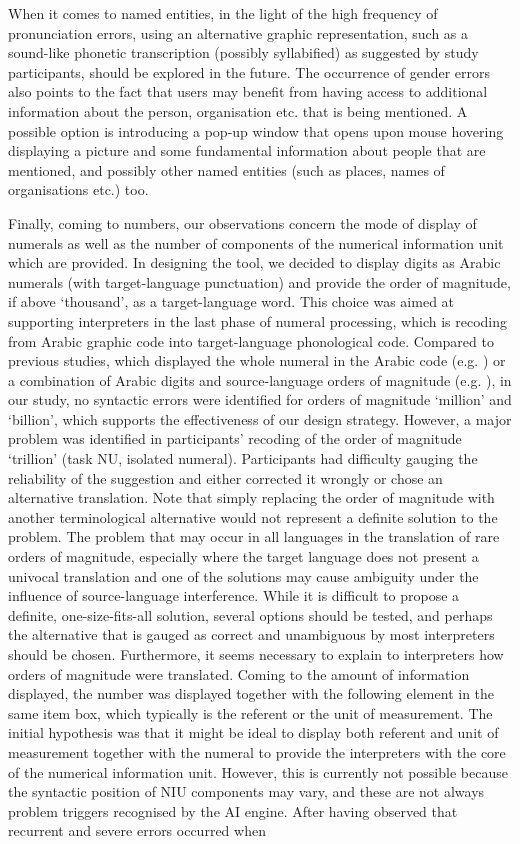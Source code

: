 When it comes to named entities, in the light of the high frequency of pronunciation errors, using an alternative graphic representation, such as a sound-like phonetic transcription (possibly syllabified) as suggested by study participants, should be explored in the future. The occurrence of gender errors also points to the fact that users may benefit from having access to additional information about the person, organisation etc. that is being mentioned. A possible option is introducing a pop-up window that opens upon mouse hovering displaying a picture and some fundamental information about people that are mentioned, and possibly other named entities (such as places, names of organisations etc.) too.

Finally, coming to numbers, our observations concern the mode of display of numerals as well as the number of components of the numerical information unit which are provided. In designing the tool, we decided to display digits as Arabic numerals (with target-language punctuation) and provide the order of magnitude, if above ‘thousand’, as a target-language word. This choice was aimed at supporting interpreters in the last phase of numeral processing, which is recoding from Arabic graphic code into target-language phonological code. Compared to previous studies, which displayed the whole numeral in the Arabic code (e.g. \cite{canali2019technologie}) or a combination of Arabic digits and source-language orders of magnitude (e.g. \cite{pisani2021measuring}), in our study, no syntactic errors were identified for orders of magnitude ‘million’ and ‘billion’, which supports the effectiveness of our design strategy. However, a major problem was identified in participants’ recoding of the order of magnitude ‘trillion’ (task NU, isolated numeral). Participants had difficulty gauging the reliability of the suggestion and either corrected it wrongly or chose an alternative translation. Note that simply replacing the order of magnitude with another terminological alternative would not represent a definite solution to the problem. The problem that may occur in all languages in the translation of rare orders of magnitude, especially where the target language does not present a univocal translation and one of the solutions may cause ambiguity under the influence of source-language interference. While it is difficult to propose a definite, one-size-fits-all solution, several options should be tested, and perhaps the alternative that is gauged as correct and unambiguous by most interpreters should be chosen. Furthermore, it seems necessary to explain to interpreters how orders of magnitude were translated. Coming to the amount of information displayed, the number was displayed together with the following element in the same item box, which typically is the referent or the unit of measurement. The initial hypothesis was that it might be ideal to display both referent and unit of measurement together with the numeral to provide the interpreters with the core of the numerical information unit. However, this is currently not possible because the syntactic position of NIU components may vary, and these are not always problem triggers recognised by the AI engine. After having observed that recurrent and severe errors occurred when 